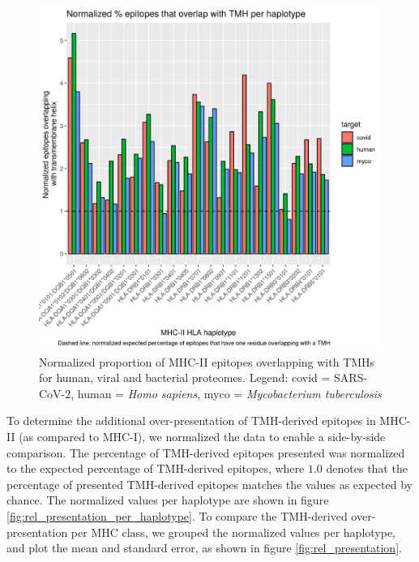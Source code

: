 \begin{figure}[!htbp]
  \includegraphics[width=\textwidth]{bbbq_1_smart_results/fig_f_tmh_mhc2_2_normalized.png}
  \caption{
    Normalized proportion of MHC-II epitopes overlapping with TMHs
    for human, viral and bacterial proteomes.
    Legend: covid = SARS-CoV-2,
    human = \emph{Homo sapiens}, myco = \emph{Mycobacterium tuberculosis}
  }
  \label{fig:f_tmh_mhc2_normalized}
\end{figure}

To determine the additional over-presentation of TMH-derived epitopes 
in MHC-II (as compared to MHC-I), we normalized the data to enable
a side-by-side comparison. 
The percentage of TMH-derived epitopes presented was normalized
to the expected percentage of TMH-derived epitopes,
where $1.0$ denotes that the percentage of presented TMH-derived epitopes
matches the values as expected by chance.
The normalized values per haplotype are shown 
in figure \ref{fig:rel_presentation_per_haplotype}.
To compare the TMH-derived over-presentation per MHC class,
we grouped the normalized values per haplotype, 
and plot the mean and standard error, as shown in figure \ref{fig:rel_presentation}.

